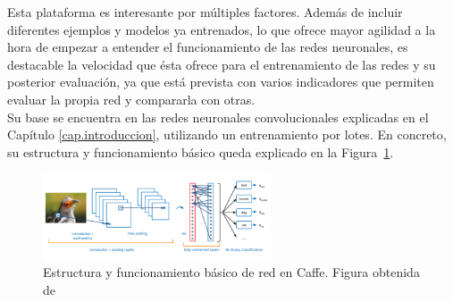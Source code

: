 Esta plataforma es interesante por múltiples factores. Además de incluir diferentes ejemplos y modelos ya entrenados, lo que ofrece mayor agilidad a la hora de empezar a entender el funcionamiento de las redes neuronales, es destacable la velocidad que ésta ofrece para el entrenamiento de las redes y su posterior evaluación, ya que está prevista con varios indicadores que permiten evaluar la propia red y compararla con otras.\\ 

Su base se encuentra en las redes neuronales convolucionales explicadas en el Capítulo \ref{cap.introduccion}, utilizando un entrenamiento por lotes. En concreto, su estructura y funcionamiento básico queda explicado en la Figura~\ref{fig.redCaffe}.\\

\begin{figure}[H]
	\begin{center}
		\includegraphics[width=0.6\textwidth]{figures/red_caffe}
		\caption{Estructura y funcionamiento básico de red en Caffe. Figura obtenida de~\cite{caffe}}
		\label{fig.redCaffe}
	\end{center}
\end{figure}

